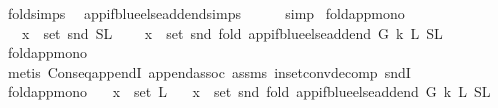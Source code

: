 \begin{isabellebody}
\ fold{\isacharunderscore}{\kern0pt}simps{\isacharparenleft}{\kern0pt}{}{\isacharparenright}{\kern0pt}\ \isamarkupfalse%
\ app{\isacharunderscore}{\kern0pt}if{\isacharunderscore}{\kern0pt}blue{\isacharunderscore}{\kern0pt}else{\isacharunderscore}{\kern0pt}add{\isacharunderscore}{\kern0pt}end{\isachardot}{\kern0pt}simps\isanewline
\ \ \ \ \isamarkupfalse%
\ simp\isanewline
{}\isamarkupfalse%
%
\endisatagproof
{\isafoldproof}%
%
\isadelimproof
\isanewline
%
\endisadelimproof
\isanewline
\isanewline
{}\isamarkupfalse%
\ fold{\isacharunderscore}{\kern0pt}app{\isacharunderscore}{\kern0pt}mono{}{\isacharcolon}{\kern0pt}\isanewline
\ \ \ {\isachardoublequoteopen}x\ {\isasymin}\ set\ {\isacharparenleft}{\kern0pt}snd\ {\isacharparenleft}{\kern0pt}S{\isacharcomma}{\kern0pt}L{}{\isacharparenright}{\kern0pt}{\isacharparenright}{\kern0pt}{\isachardoublequoteclose}\isanewline
\ \ \ {\isachardoublequoteopen}\ x\ {\isasymin}\ set\ {\isacharparenleft}{\kern0pt}snd\ {\isacharparenleft}{\kern0pt}fold\ {\isacharparenleft}{\kern0pt}app{\isacharunderscore}{\kern0pt}if{\isacharunderscore}{\kern0pt}blue{\isacharunderscore}{\kern0pt}else{\isacharunderscore}{\kern0pt}add{\isacharunderscore}{\kern0pt}end\ G\ k{\isacharparenright}{\kern0pt}\ L{}\ {\isacharparenleft}{\kern0pt}S{}{\isacharcomma}{\kern0pt}L{}{\isacharparenright}{\kern0pt}{\isacharparenright}{\kern0pt}{\isacharparenright}{\kern0pt}{\isachardoublequoteclose}\isanewline
%
\isadelimproof
\ \ %
\endisadelimproof
%
\isatagproof
{}\isamarkupfalse%
\ fold{\isacharunderscore}{\kern0pt}app{\isacharunderscore}{\kern0pt}mono\isanewline
\ \ \isamarkupfalse%
\ {\isacharparenleft}{\kern0pt}metis\ Cons{\isacharunderscore}{\kern0pt}eq{\isacharunderscore}{\kern0pt}appendI\ append{\isachardot}{\kern0pt}assoc\ assms\ in{\isacharunderscore}{\kern0pt}set{\isacharunderscore}{\kern0pt}conv{\isacharunderscore}{\kern0pt}decomp\ sndI{\isacharparenright}{\kern0pt}%
\endisatagproof
{\isafoldproof}%
%
\isadelimproof
\ \isanewline
%
\endisadelimproof
\isanewline
{}\isamarkupfalse%
\ fold{\isacharunderscore}{\kern0pt}app{\isacharunderscore}{\kern0pt}mono{}{\isacharcolon}{\kern0pt}\isanewline
\ \ \ {\isachardoublequoteopen}x\ {\isasymin}\ set\ L{}{\isachardoublequoteclose}\isanewline
\ \ \ {\isachardoublequoteopen}x\ {\isasymin}\ set\ {\isacharparenleft}{\kern0pt}snd\ {\isacharparenleft}{\kern0pt}fold\ {\isacharparenleft}{\kern0pt}app{\isacharunderscore}{\kern0pt}if{\isacharunderscore}{\kern0pt}blue{\isacharunderscore}{\kern0pt}else{\isacharunderscore}{\kern0pt}add{\isacharunderscore}{\kern0pt}end\ G\ k{\isacharparenright}{\kern0pt}\ L{}\ {\isacharparenleft}{\kern0pt}S{\isacharcomma}{\kern0pt}L{}{\isacharparenright}{\kern0pt}{\isacharparenright}{\kern0pt}{\isacharparenright}{\kern0pt}{\isachardoublequoteclose}\ \isanewline

\end{isabellebody}
